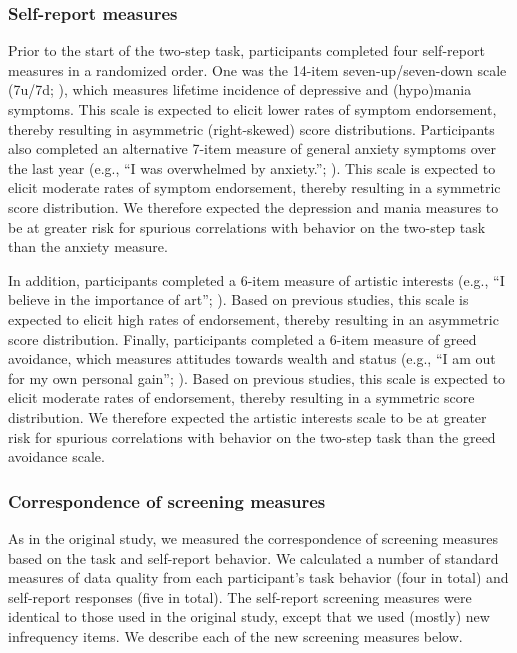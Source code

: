 \documentclass[a4paper,notitlepage,12pt]{article}
\begin{document}
\subsubsection*{Self-report measures}

Prior to the start of the two-step task, participants completed four self-report measures in a randomized order. One was the 14-item seven-up/seven-down scale (7u/7d; \cite{youngstrom_2013_susd-2}), which measures lifetime incidence of depressive and (hypo)mania symptoms. This scale is expected to elicit lower rates of symptom endorsement, thereby resulting in asymmetric (right-skewed) score distributions. Participants also completed an alternative 7-item measure of general anxiety symptoms over the last year (e.g., ``I was overwhelmed by anxiety.''; \cite{watson2022development}). This scale is expected to elicit moderate rates of symptom endorsement, thereby resulting in a symmetric score distribution. We therefore expected the depression and mania measures to be at greater risk for spurious correlations with behavior on the two-step task than the anxiety measure. 

In addition, participants completed a 6-item measure of artistic interests (e.g., ``I believe in the importance of art''; \cite{ashton2007empirical}). Based on previous studies, this scale is expected to elicit high rates of endorsement, thereby resulting in an asymmetric score distribution. Finally, participants completed a 6-item measure of greed avoidance, which measures attitudes towards wealth and status (e.g., ``I am out for my own personal gain''; \cite{ashton2007empirical}). Based on previous studies, this scale is expected to elicit moderate rates of endorsement, thereby resulting in a symmetric score distribution. We therefore expected the artistic interests scale to be at greater risk for spurious correlations with behavior on the two-step task than the greed avoidance scale. 

\subsubsection*{Correspondence of screening measures}

As in the original study, we measured the correspondence of screening measures based on the task and self-report behavior. We calculated a number of standard measures of data quality from each participant's task behavior (four in total) and self-report responses (five in total). The self-report screening measures were identical to those used in the original study, except that we used (mostly) new infrequency items. We describe each of the new screening measures below.
\end{document}
